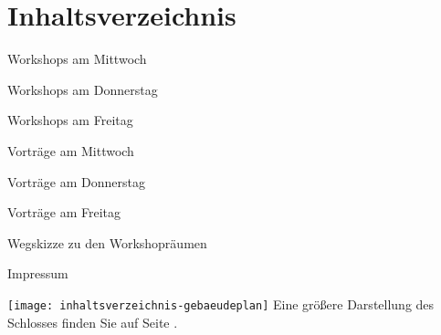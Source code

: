 \section*{Inhaltsverzeichnis}

\vspace*{0.35em}%
\noindent Workshops am Mittwoch \dotfill \pageref{mittwoch-workshops}

\vspace*{0.35em}%
\noindent Workshops am Donnerstag \dotfill \pageref{donnerstag-workshops}

\vspace*{0.35em}%
\noindent Workshops am Freitag \dotfill \pageref{freitag-workshops}

\vspace*{0.35em}%
\noindent Vorträge am Mittwoch \dotfill \pageref{mittwoch}

\vspace*{0.35em}%
\noindent Vorträge am Donnerstag \dotfill \pageref{donnerstag}

\vspace*{0.35em}%
\noindent Vorträge am Freitag \dotfill \pageref{freitag}

\vspace*{0.35em}%
\noindent Wegskizze zu den Workshopräumen \dotfill \pageref{karte}

\vspace*{0.35em}%
\noindent Impressum \dotfill \pageref{impressum}\\

\begin{center}
	\texttt{[image: inhaltsverzeichnis-gebaeudeplan]}
\noindent Eine größere Darstellung des Schlosses finden Sie auf Seite \pageref{gebaeudeplan}.
\end{center}